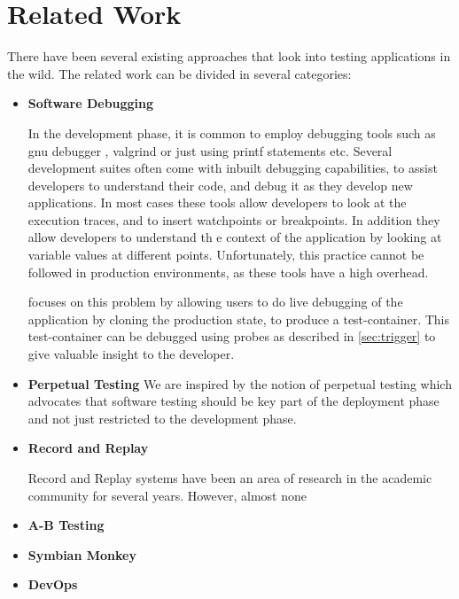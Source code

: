 
\section{Related Work}
\label{sec:related}

There have been several existing approaches that look into testing applications in the wild. 
The related work can be divided in several categories:

\begin{itemize}
  
  \item \textbf{Software Debugging}
  
  In the development phase, it is common to employ debugging tools such as gnu debugger \cite{gdb}, valgrind \cite{valgrind} or just using printf statements etc.
  Several development suites\cite{eclipse, visual_studio, intel_suite} often come with inbuilt debugging capabilities, to assist developers to understand their code, and debug it as they develop new applications.
  In most cases these tools allow developers to look at the execution traces, and to insert watchpoints or breakpoints.
  In addition they allow developers to understand th      e context of the application by looking at variable values at different points.
  Unfortunately, this practice cannot be followed in production environments, as these tools have a high overhead.
  
  \parikshan focuses on this problem by allowing users to do live debugging of the application by cloning the production state, to produce a test-container.
  This test-container can be debugged using probes as described in \ref{sec:trigger} to give valuable insight to the developer.
  
    
  \item \textbf{Perpetual Testing}
     We are inspired by the notion of perpetual testing\cite{perpetual} which advocates that software testing should be key part of the deployment phase and not just restricted to the development phase.
  
  \item \textbf{Record and Replay}
  
  Record and Replay systems have been an area of research in the academic community for several years.
  However, almost none  
  
  \cite{altekar2009odr,dunlap2002revirt,guo2008r2, geels2007friday, laadan2010transparent}
  
  \item \textbf{A-B Testing}
  \item \textbf{Symbian Monkey}
   \item \textbf{DevOps}
\end{itemize}
  

